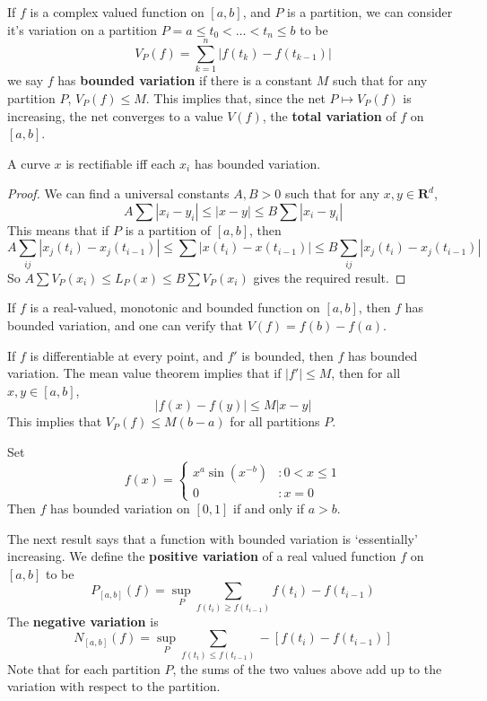 If $f$ is a complex valued function on $[a,b]$, and $P$ is a partition, we can consider it's variation on a partition $P = a \leq t_0 < \dots < t_n \leq b$ to be
%
\[ V_P(f) = \sum_{k = 1}^n |f(t_k) - f(t_{k-1})| \]
%
we say $f$ has {\bf bounded variation} if there is a constant $M$ such that for any partition $P$, $V_P(f) \leq M$. This implies that, since the net $P \mapsto V_P(f)$ is increasing, the net converges to a value $V(f)$, the {\bf total variation} of $f$ on $[a,b]$.

\begin{theorem}
    A curve $x$ is rectifiable iff each $x_i$ has bounded variation.
\end{theorem}
\begin{proof}
    We can find a universal constants $A,B > 0$ such that for any $x,y \in \mathbf{R}^d$,
    \[ A \sum |x_i - y_i| \leq |x-y| \leq B \sum |x_i - y_i| \]
    This means that if $P$ is a partition of $[a,b]$, then
    \[ A \sum_{ij} |x_j(t_i) - x_j(t_{i-1})| \leq \sum |x(t_i) - x(t_{i-1})| \leq B \sum_{ij} |x_j(t_i) - x_j(t_{i-1})| \]
    So $A \sum V_P(x_i) \leq L_P(x) \leq B \sum V_P(x_i)$ gives the required result.
\end{proof}

\begin{example}
    If $f$ is a real-valued, monotonic and bounded function on $[a,b]$, then $f$ has bounded variation, and one can verify that $V(f) = f(b) - f(a)$.
\end{example}

\begin{example}
    If $f$ is differentiable at every point, and $f'$ is bounded, then $f$ has bounded variation. The mean value theorem implies that if $|f'| \leq M$, then for all $x,y \in [a,b]$,
    \[ |f(x) - f(y)| \leq M |x-y| \]
    This implies that $V_P(f) \leq M(b-a)$ for all partitions $P$.
\end{example}

\begin{example}
    Set
    \[ f(x) = \begin{cases} x^a \sin(x^{-b}) &: 0 < x \leq 1 \\ 0 &: x = 0 \end{cases} \]
    Then $f$ has bounded variation on $[0,1]$ if and only if $a > b$.
\end{example}

The next result says that a function with bounded variation is `essentially' increasing. We define the {\bf positive variation} of a real valued function $f$ on $[a,b]$ to be
%
\[ P_{[a,b]}(f) = \sup_P \sum_{f(t_i) \geq f(t_{i-1})} f(t_i) - f(t_{i-1}) \]
%
The {\bf negative variation} is
%
\[ N_{[a,b]}(f) = \sup_P \sum_{f(t_i) \leq f(t_{i-1})} -[f(t_i) - f(t_{i-1})] \]
%
Note that for each partition $P$, the sums of the two values above add up to the variation with respect to the partition.

